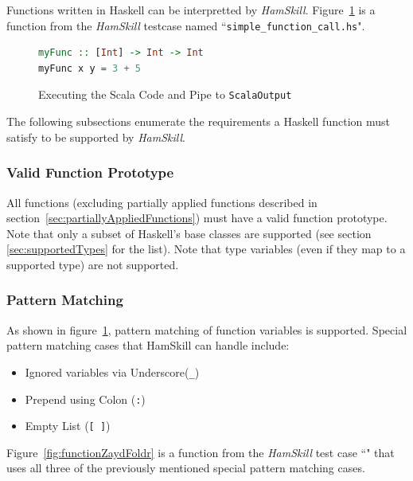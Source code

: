 \documentclass{report}
\begin{document}
Functions written in Haskell can be interpretted by \textit{HamSkill}.  Figure~\ref{fig:myFuncDefinition} is a function from the \textit{HamSkill} testcase named ``\texttt{simple\_function\_call.hs}".

\begin{figure}[H]
\begin{mdframed}
\begin{lstlisting}[language=Haskell]
myFunc :: [Int] -> Int -> Int
myFunc x y = 3 + 5
\end{lstlisting}
\end{mdframed}
\caption{Executing the Scala Code and Pipe to \texttt{ScalaOutput}}\label{fig:myFuncDefinition}
\end{figure}

The following subsections enumerate the requirements a Haskell function must satisfy to be supported by \textit{HamSkill}.

\subsubsection{Valid Function Prototype}

All functions (excluding partially applied functions described in section~\ref{sec:partiallyAppliedFunctions}) must have a valid function prototype.  Note that only a subset of Haskell's base classes are supported (see section \ref{sec:supportedTypes} for the list).  Note that type variables (even if they map to a supported type) are not supported.

\subsubsection{Pattern Matching}

As shown in figure~\ref{fig:myFuncDefinition}, pattern matching of function variables is supported.  Special pattern matching cases that HamSkill can handle include:

\begin{itemize}

\item Ignored variables via Underscore(\texttt{\_})

\item Prepend using Colon (\texttt{:})

\item Empty List (\texttt{[ ]})

\end{itemize}

Figure~\ref{fig:functionZaydFoldr} is a function from the \textit{HamSkill} test case ``" that uses all three of the previously mentioned special pattern matching cases.
\end{document}
